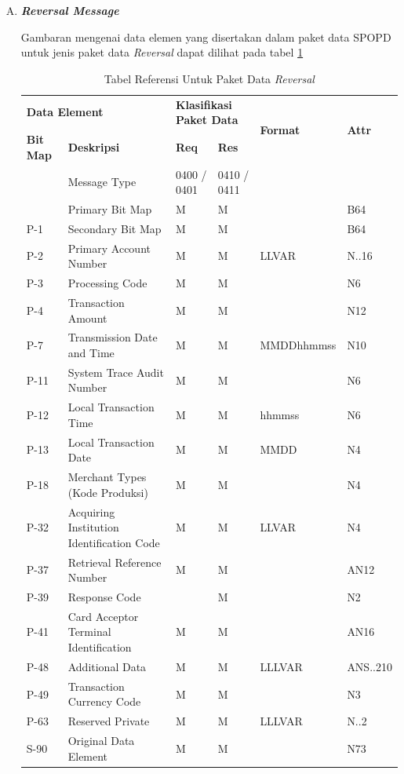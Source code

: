 \begin{enumerate}[A.]
  \item \textbf{\textit{Reversal Message}}
  
  Gambaran mengenai data elemen yang disertakan dalam paket data SPOPD untuk jenis paket data \textit{Reversal} dapat dilihat pada tabel \ref{tab:reversal}
  
  \begin{table}[H]
    \centering
    \scriptsize
    \begin{tabular}{|p{3em}|p{10em}|p{3em}|p{3em}|l|l|}
    \hline
    \multicolumn{2}{|p{13em}|}{\textbf{Data Element}} & \multicolumn{2}{|p{6em}|}{\textbf{Klasifikasi Paket Data}} & \multirow{2}{*}{\textbf{Format}} & \multirow{2}{*}{\textbf{Attr}} \\
    \cline{1-4}
    \textbf{Bit Map} & \textbf{Deskripsi} & \textbf{Req} & \textbf{Res} & & \\
    \hline
    \hline
    & Message Type & 0400 / 0401 & 0410 / 0411 & & \\
    \hline
    & Primary Bit Map & M & M & & B64 \\
    \hline
    P-1 & Secondary Bit Map & M & M & & B64 \\
    \hline
    P-2 & Primary Account Number & M & M & LLVAR & N..16 \\
    \hline
    P-3 & Processing Code & M & M & & N6 \\
    \hline
    P-4 & Transaction Amount & M & M & & N12 \\
    \hline
    P-7 & Transmission Date and Time & M & M & MMDDhhmmss & N10 \\
    \hline
    P-11 & System Trace Audit Number & M & M & & N6 \\
    \hline
    P-12 & Local Transaction Time & M & M & hhmmss & N6 \\
    \hline
    P-13 & Local Transaction Date & M & M & MMDD & N4 \\
    \hline
    P-18 & Merchant Types (Kode Produksi) & M & M & & N4 \\
    \hline
    P-32 & Acquiring Institution Identification Code & M & M & LLVAR & N4 \\
    \hline
    P-37 & Retrieval Reference Number & M & M & & AN12 \\
    \hline
    P-39 & Response Code & & M & & N2 \\
    \hline
    P-41 & Card Acceptor Terminal Identification & M & M & & AN16 \\
    \hline
    P-48 & Additional Data & M & M & LLLVAR & ANS..210 \\
    \hline
    P-49 & Transaction Currency Code & M & M & & N3 \\
    \hline
    P-63 & Reserved Private & M & M & LLLVAR & N..2 \\
    \hline
    S-90 & Original Data Element & M & M & & N73 \\
    \hline
    \end{tabular}
    \caption{Tabel Referensi Untuk Paket Data \textit{Reversal}}
    \label{tab:reversal}
  \end{table}
  

\end{enumerate}
